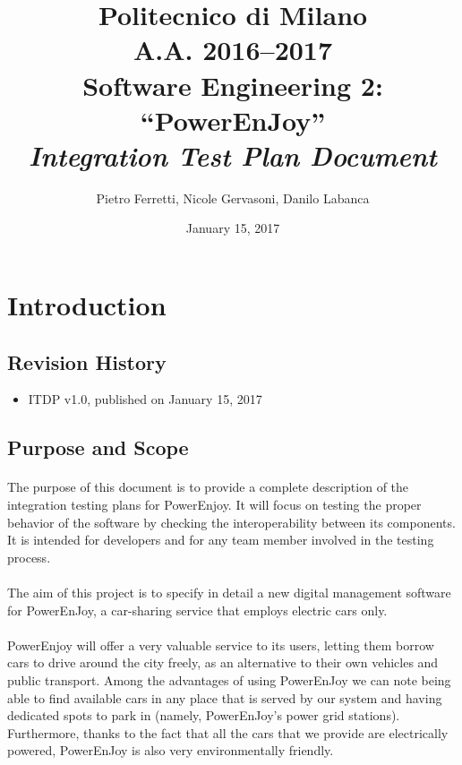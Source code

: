 \documentclass[english]{article}
\begin{document}
\title{Politecnico di Milano\\
 A.A. 2016–2017 \\
Software Engineering 2: “PowerEnJoy” \\
\emph{Integration Test Plan Document}}

\author{Pietro Ferretti, Nicole Gervasoni, Danilo Labanca}
\date{January 15, 2017}
\maketitle

\newpage

\tableofcontents{}

\newpage

\section{Introduction}

\subsection{Revision History}
\begin{itemize}
	\item{ITDP v1.0, published on January 15, 2017}
\end{itemize}
\subsection{Purpose and Scope}

\paragraph{}
The purpose of this document is to provide a complete description of the integration testing plans for PowerEnjoy. It will focus on testing the proper behavior of the software by checking the
interoperability between its components.
It is intended for developers and for any team member involved in the testing process.

\paragraph{}
The aim of this project is to specify in detail a new digital management software for PowerEnJoy, a car-sharing service that employs electric cars only.

\paragraph{}
PowerEnjoy will offer a very valuable service to its users, letting them borrow cars to drive around the city freely, as an alternative to their own vehicles and public transport.
Among the advantages of using PowerEnJoy we can note being able to find available cars in any place that is served by our system and having dedicated spots to park in (namely, PowerEnJoy's power grid stations).
Furthermore, thanks to the fact that all the cars that we provide are electrically powered, PowerEnJoy is also very environmentally friendly.
\end{document}
